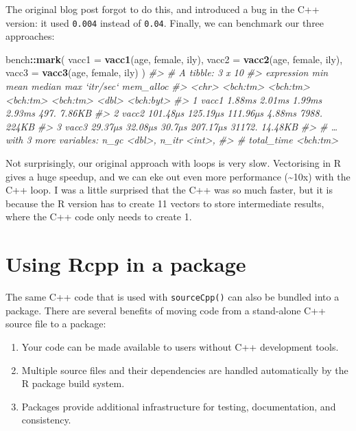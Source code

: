 \documentclass[]{book}
\newenvironment{Shaded}{\begin{snugshade}}{\end{snugshade}}
\newcommand{\CommentTok}[1]{\textcolor[rgb]{0.37,0.37,0.37}{\textit{#1}}}
\newcommand{\DataTypeTok}[1]{\textcolor[rgb]{0.27,0.27,0.27}{#1}}
\newcommand{\KeywordTok}[1]{\textcolor[rgb]{0.27,0.27,0.27}{\textbf{#1}}}
\newcommand{\NormalTok}[1]{#1}
\newcommand{\OperatorTok}[1]{\textcolor[rgb]{0.43,0.43,0.43}{\textbf{#1}}}
\begin{document}
The original blog post forgot to do this, and introduced a bug in the C++ version: it used \texttt{0.004} instead of \texttt{0.04}. Finally, we can benchmark our three approaches:

\begin{Shaded}
\begin{Highlighting}[]
\NormalTok{bench}\OperatorTok{::}\KeywordTok{mark}\NormalTok{(}
  \DataTypeTok{vacc1 =} \KeywordTok{vacc1}\NormalTok{(age, female, ily),}
  \DataTypeTok{vacc2 =} \KeywordTok{vacc2}\NormalTok{(age, female, ily),}
  \DataTypeTok{vacc3 =} \KeywordTok{vacc3}\NormalTok{(age, female, ily)}
\NormalTok{)}
\CommentTok{#> # A tibble: 3 x 10}
\CommentTok{#>   expression      min     mean   median      max `itr/sec` mem_alloc}
\CommentTok{#>   <chr>      <bch:tm> <bch:tm> <bch:tm> <bch:tm>     <dbl> <bch:byt>}
\CommentTok{#> 1 vacc1        1.88ms   2.01ms   1.99ms   2.93ms      497.    7.86KB}
\CommentTok{#> 2 vacc2      101.48µs 125.19µs 111.96µs   4.88ms     7988.     224KB}
\CommentTok{#> 3 vacc3       29.37µs  32.08µs   30.7µs 207.17µs    31172.   14.48KB}
\CommentTok{#> # … with 3 more variables: n_gc <dbl>, n_itr <int>,}
\CommentTok{#> #   total_time <bch:tm>}
\end{Highlighting}
\end{Shaded}

Not surprisingly, our original approach with loops is very slow. Vectorising in R gives a huge speedup, and we can eke out even more performance (\textasciitilde{}10x) with the C++ loop. I was a little surprised that the C++ was so much faster, but it is because the R version has to create 11 vectors to store intermediate results, where the C++ code only needs to create 1.

\hypertarget{rcpp-package}{%
\section{Using Rcpp in a package}\label{rcpp-package}}

The same C++ code that is used with \texttt{sourceCpp()} can also be bundled into a package. There are several benefits of moving code from a stand-alone C++ source file to a package: 

\begin{enumerate}
\def\labelenumi{\arabic{enumi}.}
\item
  Your code can be made available to users without C++ development tools.
\item
  Multiple source files and their dependencies are handled automatically by
  the R package build system.
\item
  Packages provide additional infrastructure for testing, documentation, and
  consistency.
\end{enumerate}
\end{document}
